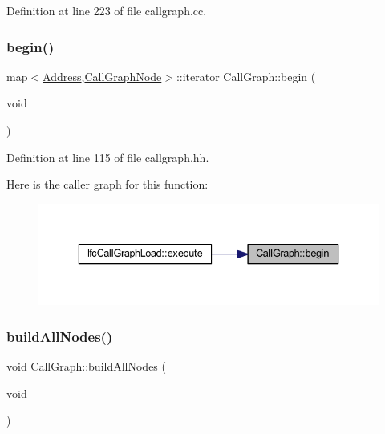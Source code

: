 Definition at line 223 of file callgraph.\+cc.

\mbox{\label{class_call_graph_a0726755cab08bdb512eb183b088bc32b}} 
\subsubsection{\texorpdfstring{begin()}{begin()}}
{\footnotesize\ttfamily map$<$\mbox{\hyperlink{class_address}{Address}},\mbox{\hyperlink{class_call_graph_node}{Call\+Graph\+Node}}$>$\+::iterator Call\+Graph\+::begin (\begin{DoxyParamCaption}\item[{void}]{ }\end{DoxyParamCaption})\hspace{0.3cm}{\ttfamily [inline]}}



Definition at line 115 of file callgraph.\+hh.

Here is the caller graph for this function\+:
\nopagebreak
\begin{figure}[H]
\begin{center}
\leavevmode
\includegraphics[width=336pt]{class_call_graph_a0726755cab08bdb512eb183b088bc32b_icgraph}
\end{center}
\end{figure}
\mbox{\label{class_call_graph_ad551fc740c138722552a84e314a37d84}} 
\subsubsection{\texorpdfstring{buildAllNodes()}{buildAllNodes()}}
{\footnotesize\ttfamily void Call\+Graph\+::build\+All\+Nodes (\begin{DoxyParamCaption}\item[{void}]{ }\end{DoxyParamCaption})}



